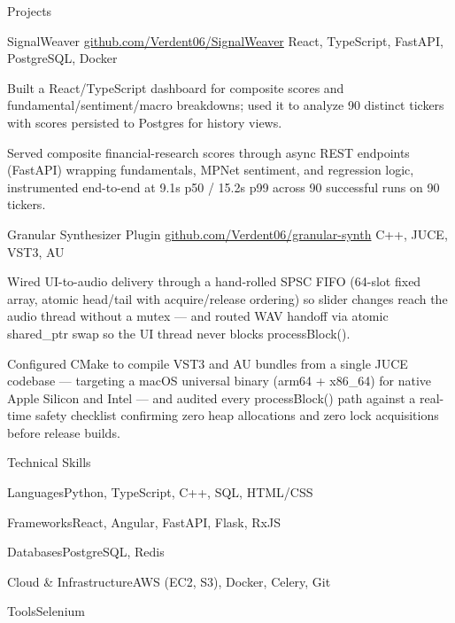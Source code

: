 \documentclass[
	11pt
]{../../../template}
\begin{document}
	\begin{rSection}{P}{rojects}
		\begin{rSectionEntry}
			{SignalWeaver}
			{\href{https://github.com/Verdent06/SignalWeaver}{github.com/Verdent06/SignalWeaver}}
			{}
			{React, TypeScript, FastAPI, PostgreSQL, Docker}
			{}

			\item Built a React/TypeScript dashboard for composite scores and fundamental/sentiment/macro breakdowns; used it to analyze 90 distinct tickers with scores persisted to Postgres for history views.
			\item Served composite financial-research scores through async REST endpoints (FastAPI) wrapping fundamentals, MPNet sentiment, and regression logic, instrumented end-to-end at 9.1s p50 / 15.2s p99 across 90 successful runs on 90 tickers.
		\end{rSectionEntry}

		\begin{rSectionEntry}
			{Granular Synthesizer Plugin}
			{\href{https://github.com/Verdent06/granular-synth}{github.com/Verdent06/granular-synth}}
			{}
			{C++, JUCE, VST3, AU}
			{}

			\item Wired UI-to-audio delivery through a hand-rolled SPSC FIFO (64-slot fixed array, atomic head/tail with acquire/release ordering) so slider changes reach the audio thread without a mutex --- and routed WAV handoff via atomic shared\_ptr swap so the UI thread never blocks processBlock().
			\item Configured CMake to compile VST3 and AU bundles from a single JUCE codebase --- targeting a macOS universal binary (arm64 + x86\_64) for native Apple Silicon and Intel --- and audited every processBlock() path against a real-time safety checklist confirming zero heap allocations and zero lock acquisitions before release builds.
		\end{rSectionEntry}
	\end{rSection}

	\begin{rSection}{T}{echnical Skills}
		\begin{rSet}{Languages}{Python, TypeScript, C++, SQL, HTML/CSS}
		\end{rSet}
		\begin{rSet}{Frameworks}{React, Angular, FastAPI, Flask, RxJS}
		\end{rSet}
		\begin{rSet}{Databases}{PostgreSQL, Redis}
		\end{rSet}
		\begin{rSet}{Cloud \& Infrastructure}{AWS (EC2, S3), Docker, Celery, Git}
		\end{rSet}
		\begin{rSet}{Tools}{Selenium}
		\end{rSet}
	\end{rSection}
\end{document}
